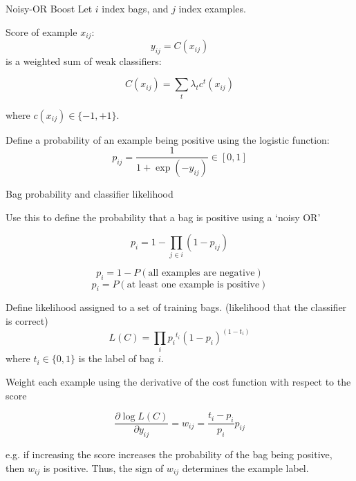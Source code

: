 \documentclass{beamer}
\begin{document}
	\begin{frame}{Noisy-OR Boost}
			Let $i$ index bags, and $j$ index examples.

			Score of example \(x_{ij}\):
			\[y_{ij} = C(x_{ij})\]
			is a weighted sum of weak classifiers:
			
			\[C(x_{ij}) = \sum_t{\lambda_t c^t(x_{ij})}\]
			
			where \(c(x_{ij}) \in \{-1, +1\}\).

			Define a probability of an example being positive using the logistic function:
			\[p_{ij} = \frac{1}{1 + \operatorname{exp}(-y_{ij})} \in [0, 1] \]

	\end{frame}


	\begin{frame}{Bag probability and classifier likelihood}

		Use this to define the probability that a bag is positive using a `noisy OR' %
		
		
		
		\[p_{i} = 1 - \prod_{j\in i}(1 - p_{ij})\]

		\[p_i = 1 - P(\text{all examples are negative})\]
		\[p_i = P(\text{at least one example is positive})\]


		Define likelihood assigned to a set of training bags.
		(likelihood that the classifier is correct)
		\[L(C) = \prod_{i}{p_i}^{t_i}(1 - p_{i})^(1-t_i)\]
		where \(t_i \in \{0, 1\} \) is the label of bag \(i\).

	\end{frame}
	
	\begin{frame}{}

		Weight each example using the derivative of the cost function with respect to the score
		
		\[ \frac{\partial \operatorname{log} L(C)}{\partial y_{ij}} = w_{ij} = \frac{t_i - p_i}{p_i}p_{ij} \]
		
		e.g. if increasing the score increases the probability of the bag being positive, then $w_{ij}$ is positive. Thus, the sign of $w_{ij}$ determines the example label.

	\end{frame}
	
\end{document}
